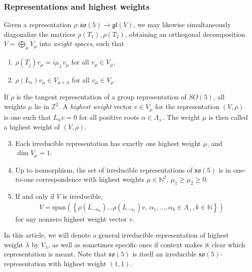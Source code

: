 \documentclass[11pt,reqno]{amsart}
\theoremstyle{remark}
\theoremstyle{definition}
\newcommand{\sov}{\mathfrak{so}(5)}
\begin{document}
\subsubsection{Representations and highest weights}
Given a representation $\rho: \sov \to \mathfrak{gl}(V)$, we may likewise simultaneously diagonalize the matrices $\rho(T_1),\rho(T_2)$, obtaining an orthogonal decomposition $V = \bigoplus_{\mu} V_\mu$ into \emph{weight spaces}, such that 
\begin{enumerate}
    \item $\rho(T_j) v_\mu = i \mu_j \, v_\mu$ for all $v_\mu \in V_\mu$,
    \item $\rho(L_\alpha) v_\mu \in V_{\mu + \alpha}$ for all $v_\mu \in V_\mu$.
\end{enumerate}
If $\rho$ is the tangent representation of a group representation of $SO(5)$, all weights $\mu$ lie in $\mathbb Z^2$. A \emph{highest weight} vector $v \in V_\mu$ for the representation $(V,\rho)$ is one such that $L_\alpha v = 0$ for all positive roots $\alpha \in \Lambda_+$. The weight $\mu$ is then called a highest weight of $(V,\rho)$.
\begin{enumerate}
  \setcounter{enumi}{2}
    \item Each irreducible representation has exactly one highest weight $\mu$, and $\dim V_\mu = 1$.
    \item Up to isomorphism, the set of irreducible representations of $\sov$ is in one-to-one correspondence with highest weights $\mu \in \mathbb N^2$, $\mu_1 \geq \mu_2 \geq 0$.
    \item If and only if $V$ is irreducible,
    \begin{align*}
        V = \mathrm{span}\left(\left\{\rho(L_{- \alpha_k}) \ldots \rho(L_{- \alpha_1}) v, \, \alpha_1,\ldots,\alpha_k \in \Lambda_+, k \in \mathbb N\right\}\right)
    \end{align*}
    for any nonzero highest weight vector $v$.
\end{enumerate}
In this article, we will denote a general irreducible representation of highest weight $\lambda$ by $V_\lambda$, as well as sometimes specific ones if context makes it clear which representation is meant. Note that $\sov$ is itself an irreducible $\sov$-representation with highest weight $(1,1)$.
\end{document}
